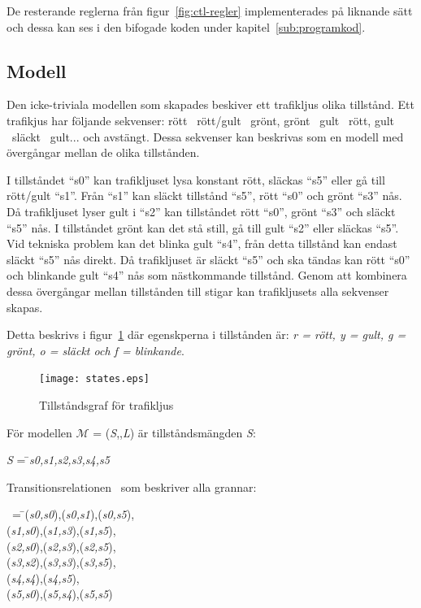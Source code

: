 De resterande reglerna från figur~\ref{fig:ctl-regler} implementerades på liknande sätt och dessa kan ses i den bifogade koden under kapitel~\ref{sub:programkod}.

\subsection{Modell}\label{sub:modell}

Den icke-triviala modellen som skapades beskiver ett trafikljus olika tillstånd. Ett trafikjus har följande sekvenser: rött \textrightarrow\ rött/gult \textrightarrow\ grönt, grönt \textrightarrow\ gult \textrightarrow\ rött, gult \textrightarrow\ släckt  \textrightarrow\ gult... och avstängt. Dessa sekvenser kan beskrivas som en modell med övergångar mellan de olika tillstånden.

I tillståndet “s0” kan trafikljuset lysa konstant rött, släckas “s5” eller gå till rött/gult “s1”. Från “s1” kan släckt tillstånd “s5”, rött “s0” och grönt “s3” nås. Då trafikljuset lyser gult i “s2” kan tillståndet rött “s0”, grönt “s3” och släckt “s5” nås. I tillståndet grönt kan det stå still, gå till gult “s2” eller släckas “s5”. Vid tekniska problem kan det blinka gult “s4”, från detta tillstånd kan endast släckt “s5” nås direkt. Då trafikljuset är släckt “s5” och ska tändas kan rött “s0” och blinkande gult “s4” nås som nästkommande tillstånd. Genom att kombinera dessa övergångar mellan tillstånden till stigar kan trafikljusets alla sekvenser skapas.

Detta beskrivs i figur~\ref{fig:ctl-states} där egenskperna i tillstånden är: \textit{r = rött, y = gult, g = grönt, o = släckt och f = blinkande}.

\begin{figure}[ht]
\texttt{[image: states.eps]}
\caption{Tillståndsgraf för trafikljus}
\label{fig:ctl-states}
\end{figure}

För modellen $\mathcal{M}$ = (\textit{S},\textrightarrow,\textit{L}) är tillståndsmängden \textit{S}:

\begin{tabbing}
\textit{S} = \= \textbraceleft \textit{s0,s1,s2,s3,s4,s5}\textbraceright\\
\end{tabbing}

Transitionsrelationen \textrightarrow\ som beskriver alla grannar: 
\begin{tabbing}
\textrightarrow\ = \= \textbraceleft (\textit{s0,s0}),(\textit{s0,s1}),(\textit{s0,s5}),\\
\> (\textit{s1,s0}),(\textit{s1,s3}),(\textit{s1,s5}),\\
\> (\textit{s2,s0}),(\textit{s2,s3}),(\textit{s2,s5}),\\
\> (\textit{s3,s2}),(\textit{s3,s3}),(\textit{s3,s5}),\\
\> (\textit{s4,s4}),(\textit{s4,s5}),\\
\> (\textit{s5,s0}),(\textit{s5,s4}),(\textit{s5,s5})\textbraceright\\
\end{tabbing}

